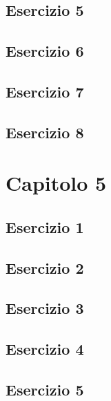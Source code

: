\documentclass[a4paper,12pt,oneside]{book}
\begin{document}
\hypertarget{esercizio-5}{%
\subsection{Esercizio 5}\label{esercizio-5}}

\hypertarget{esercizio-6}{%
\subsection{Esercizio 6}\label{esercizio-6}}

\hypertarget{esercizio-7}{%
\subsection{Esercizio 7}\label{esercizio-7}}

\hypertarget{esercizio-8}{%
\subsection{Esercizio 8}\label{esercizio-8}}

\hypertarget{capitolo-5}{%
\section{Capitolo 5}\label{capitolo-5}}

\hypertarget{esercizio-1-3}{%
\subsection{Esercizio 1}\label{esercizio-1-3}}

\hypertarget{esercizio-2-3}{%
\subsection{Esercizio 2}\label{esercizio-2-3}}

\hypertarget{esercizio-3-2}{%
\subsection{Esercizio 3}\label{esercizio-3-2}}

\hypertarget{esercizio-4-1}{%
\subsection{Esercizio 4}\label{esercizio-4-1}}

\hypertarget{esercizio-5-1}{%
\subsection{Esercizio 5}\label{esercizio-5-1}}
\end{document}
